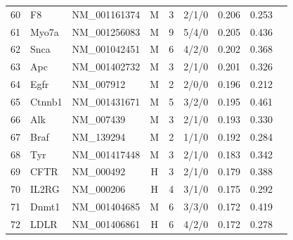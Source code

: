 \begin{table}[h]
\begin{tabular}{rllcrrrcc}
60 & F8 & NM\_001161374 & M & 3 & 2/1/0 & 0.206 & 0.253 \\
61 & Myo7a & NM\_001256083 & M & 9 & 5/4/0 & 0.205 & 0.436 \\
62 & Snca & NM\_001042451 & M & 6 & 4/2/0 & 0.202 & 0.368 \\
63 & Apc & NM\_001402732 & M & 3 & 2/1/0 & 0.201 & 0.326 \\
64 & Egfr & NM\_007912 & M & 2 & 2/0/0 & 0.196 & 0.212 \\
65 & Ctnnb1 & NM\_001431671 & M & 5 & 3/2/0 & 0.195 & 0.461 \\
66 & Alk & NM\_007439 & M & 3 & 2/1/0 & 0.193 & 0.330 \\
67 & Braf & NM\_139294 & M & 2 & 1/1/0 & 0.192 & 0.284 \\
68 & Tyr & NM\_001417448 & M & 3 & 2/1/0 & 0.183 & 0.342 \\
69 & CFTR & NM\_000492 & H & 3 & 2/1/0 & 0.179 & 0.388 \\
70 & IL2RG & NM\_000206 & H & 4 & 3/1/0 & 0.175 & 0.292 \\
71 & Dnmt1 & NM\_001404685 & M & 6 & 3/3/0 & 0.172 & 0.419 \\
72 & LDLR & NM\_001406861 & H & 6 & 4/2/0 & 0.172 & 0.278 \\
\hline
\end{tabular}
\end{table}
